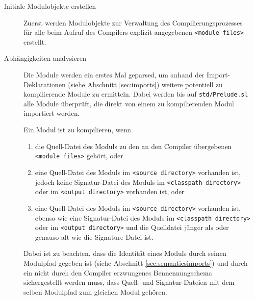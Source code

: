 \documentclass[runningheads]{llncs}
\begin{document}
\begin{description}
\item[Initiale Modulobjekte erstellen] Zuerst werden Modulobjekte zur Verwaltung
    des Compilierungsprozesses für alle beim Aufruf des Compilers
    explizit angegebenen \texttt{<module files>} erstellt.
\item[Abhängigkeiten analysieren] 
    Die Module werden ein erstes Mal geparsed, um anhand der
    Import-Deklarationen (siehe Abschnitt \ref{sec:imports}) weitere
    potentiell zu kompilierende Module zu ermitteln. Dabei werden bis
    auf \texttt{std/Prelude.sl} alle Module überprüft, die direkt von
    einem zu kompilierenden Modul importiert werden.
    
    Ein Modul ist zu kompilieren, wenn
    \begin{enumerate}
    \item die Quell-Datei des Moduls zu den an den Compiler
        übergebenen \texttt{<module files>} gehört, oder
    \item eine Quell-Datei des Moduls im \texttt{<source directory>}
        vorhanden ist, jedoch keine Signatur-Datei des Moduls im
        \texttt{<classpath directory>} oder im \texttt{<output directory>}
        vorhanden ist, oder
    \item eine Quell-Datei des Moduls im \texttt{<source directory>}
        vorhanden ist, ebenso wie eine Signatur-Datei des Moduls im
        \texttt{<classpath directory>} oder im \texttt{<output directory>}
        und die Quelldatei jünger als oder genauso alt wie die
        Signature-Datei ist.
    \end{enumerate}
    Dabei ist zu beachten, dass die Identität eines Moduls durch seinen
    Modulpfad gegeben ist (siehe Abschnitt \ref{sec:semanticsimports}) und durch ein nicht
    durch den Compiler erzwungenes Bennennungschema sichergestellt
    werden muss, dass Quell- und Signatur-Dateien mit dem selben
    Modulpfad zum gleichen Modul gehören.
    

\end{description}
\end{document}
